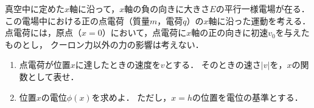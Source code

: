 \documentclass[../../../physics-standard_questions_all.tex]{subfiles}
\begin{document}
真空中に定めた$x$軸に沿って，$x$軸の負の向きに大きさ$E$の平行一様電場が在る．
この電場中における正の点電荷（質量$m$，電荷$q$）の$x$軸に沿った運動を考える．
点電荷には，原点（$x=0$）において，点電荷に$x$軸の正の向きに初速$v_0$を与えたものとし，
クーロン力以外の力の影響は考えない．

\begin{enumerate}

    \item 点電荷が位置$x$に達したときの速度を$v$とする．
    そのときの速さ$|v|$を，$x$の関数として表せ．

    \item 位置$x$の電位$\phi(x)$を求めよ．
    ただし，$x=h$の位置を電位の基準とする．

\end{enumerate}
\end{document}
